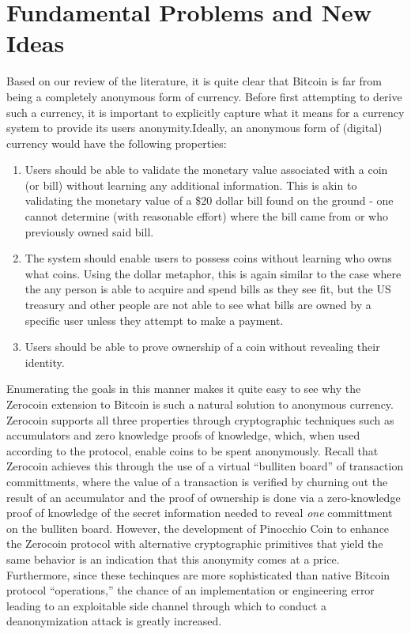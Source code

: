 \section{Fundamental Problems and New Ideas} \label{sec:open}

Based on our review of the literature, it is quite clear that Bitcoin is far from being a completely anonymous form of currency. Before first attempting to derive such a currency, it is important to explicitly capture what it means for a currency system to provide its users anonymity.Ideally, an anonymous form of (digital) currency would have the following properties:
\begin{enumerate}
	\item Users should be able to validate the monetary value associated with a coin (or bill) without learning any additional information. This is akin to validating the monetary value of a \$20 dollar bill found on the ground - one cannot determine (with reasonable effort) where the bill came from or who previously owned said bill. 
	\item The system should enable users to possess coins without learning who owns what coins. Using the dollar metaphor, this is again similar to the case where the any person is able to acquire and spend bills as they see fit, but the US treasury and other people are not able to see what bills are owned by a specific user unless they attempt to make a payment. 
	\item Users should be able to prove ownership of a coin without revealing their identity. 
\end{enumerate}

Enumerating the goals in this manner makes it quite easy to see why the Zerocoin extension to Bitcoin is such a natural solution to anonymous currency. Zerocoin supports all three properties through cryptographic techniques such as accumulators and zero knowledge proofs of knowledge, which, when used according to the protocol, enable coins to be spent anonymously. Recall that Zerocoin achieves this through the use of a virtual ``bulliten board'' of transaction committments, where the value of a transaction is verified by churning out the result of an accumulator and the proof of ownership is done via a zero-knowledge proof of knowledge of the secret information needed to reveal \emph{one} committment on the bulliten board. However, the development of Pinocchio Coin \cite{pinocchio} to enhance the Zerocoin protocol with alternative cryptographic primitives that yield the same behavior is an indication that this anonymity comes at a price. Furthermore, since these techinques are more sophisticated than native Bitcoin protocol ``operations,'' the chance of an implementation or engineering error leading to an exploitable side channel through which to conduct a deanonymization attack is greatly increased. 

